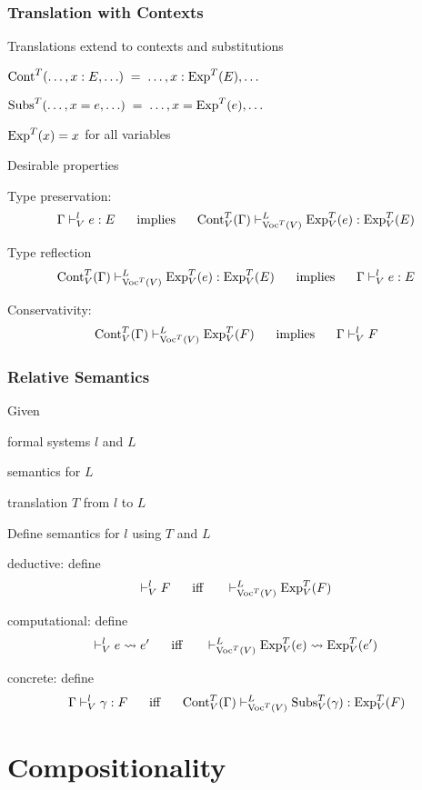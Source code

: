 \begin{frame}\frametitle{Translation with Contexts}
\begin{blockitems}{Translations extend to contexts and substitutions}
 \item $\mathrm{Cont}^T(\ldots,x:E,\ldots) \;=\;\ldots, x:\mathrm{Exp}^T(E), \ldots$
 \item $\mathrm{Subs}^T(\ldots,x=e,\ldots) \;=\;\ldots, x=\mathrm{Exp}^T(e), \ldots$
 \item $\mathrm{Exp}^T(x)=x$ for all variables
\end{blockitems}

\begin{blockitems}{Desirable properties}
\item Type preservation:
\[\Gamma\vdash^l_V e:E \hspace*{.5cm}\;\mathrm{implies}\;\hspace*{.5cm} \mathrm{Cont}^T_V(\Gamma)\vdash^L_{\mathrm{Voc}^T(V)} \mathrm{Exp}^T_V(e):\mathrm{Exp}^T_V(E)\]
\item Type reflection
\[\mathrm{Cont}^T_V(\Gamma)\vdash^L_{\mathrm{Voc}^T(V)} \mathrm{Exp}^T_V(e):\mathrm{Exp}^T_V(E)\hspace*{.5cm}\;\mathrm{implies}\;\hspace*{.5cm} \Gamma\vdash^l_V e:E \]
\item Conservativity:
\[\mathrm{Cont}^T_V(\Gamma)\vdash^L_{\mathrm{Voc}^T(V)} \mathrm{Exp}^T_V(F) \hspace*{.5cm}\;\mathrm{implies}\;\hspace*{.5cm} \Gamma\vdash^l_V F\]
\end{blockitems}
\end{frame}

\begin{frame}\frametitle{Relative Semantics}
\begin{blockitems}{Given}
 \item formal systems $l$ and $L$
 \item semantics for $L$
 \item translation $T$ from $l$ to $L$
\end{blockitems}

\begin{blockitems}{Define semantics for $l$ using $T$ and $L$}
\item deductive: define
 \[\vdash^l_V F \hspace*{.5cm}\;\mathrm{iff}\;\hspace*{.5cm} \vdash^L_{\mathrm{Voc}^T(V)} \mathrm{Exp}^T_V(F) \]
\item computational: define
 \[\vdash^l_V e\rightsquigarrow e' \hspace*{.5cm}\;\mathrm{iff}\;\hspace*{.5cm} \vdash^L_{\mathrm{Voc}^T(V)}\mathrm{Exp}^T_V(e)\rightsquigarrow \mathrm{Exp}^T_V(e')\]
\item concrete: define
 \[\Gamma\vdash^l_V \gamma:F \hspace*{.5cm}\;\mathrm{iff}\;\hspace*{.5cm} \mathrm{Cont}^T_V(\Gamma)\vdash^L_{\mathrm{Voc}^T(V)}\mathrm{Subs}^T_V(\gamma):\mathrm{Exp}^T_V(F)\]
\end{blockitems}
\end{frame}

\section{Compositionality}

